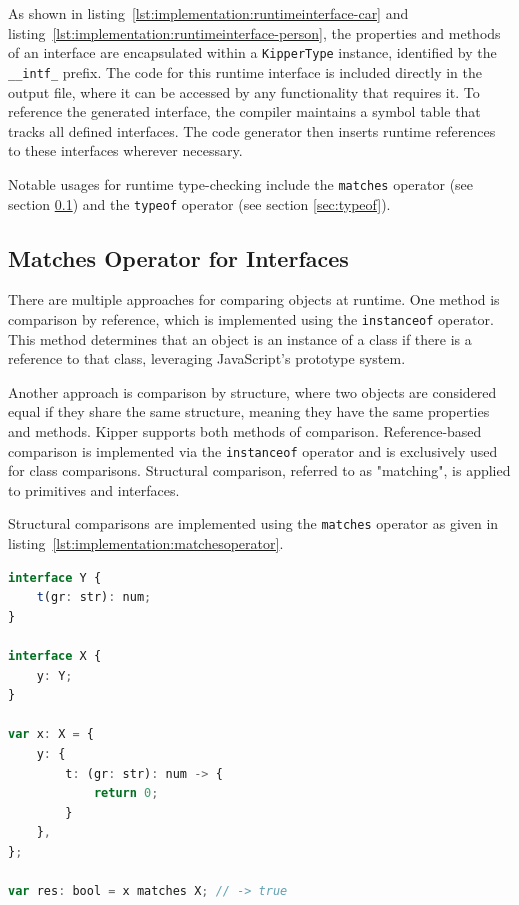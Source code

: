 As shown in listing~\ref{lst:implementation:runtimeinterface-car} and listing~\ref{lst:implementation:runtimeinterface-person}, the properties and methods of an interface are encapsulated within a \lstinline|KipperType| instance, identified by the  \lstinline|__intf_| prefix. The code for this runtime interface is included directly in the output file, where it can be accessed by any functionality that requires it. To reference the generated interface, the compiler maintains a symbol table that tracks all defined interfaces. The code generator then inserts runtime references to these interfaces wherever necessary.

Notable usages for runtime type-checking include the \lstinline|matches| operator (see section \ref{sec:matches}) and the \lstinline|typeof| operator (see section \ref{sec:typeof}).

\subsection{Matches Operator for Interfaces}
\label{sec:matches}

There are multiple approaches for comparing objects at runtime. One method is comparison by reference, which is implemented using the \lstinline|instanceof| operator. This method determines that an object is an instance of a class if there is a reference to that class, leveraging JavaScript's prototype system.

Another approach is comparison by structure, where two objects are considered equal if they share the same structure, meaning they have the same properties and methods. Kipper supports both methods of comparison. Reference-based comparison is implemented via the \lstinline|instanceof| operator and is exclusively used for class comparisons. Structural comparison, referred to as "matching", is applied to primitives and interfaces. 

Structural comparisons are implemented using the \lstinline|matches| operator as given in listing~\ref{lst:implementation:matchesoperator}.

\begin{lstlisting}[language=Typescript,caption=The Kipper matches operator,label=lst:implementation:matchesoperator]
interface Y {
	t(gr: str): num;
}

interface X {
	y: Y;
}

var x: X = {
	y: {
		t: (gr: str): num -> {
			return 0;
		}
	},
};

var res: bool = x matches X; // -> true
\end{lstlisting}

